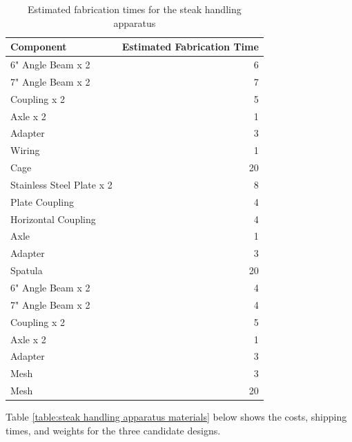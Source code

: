 \documentclass[11pt]{article}
\begin{document}
\begin{table}[H]
\begin{tabularx}{\textwidth}{X r}

\hline

Component & Estimated Fabrication Time \\

\hline

6" Angle Beam x 2 & 6 \\
7" Angle Beam x 2 & 7 \\
Coupling x 2 & 5 \\
Axle x 2 & 1 \\
Adapter & 3 \\
Wiring & 1 \\

\hline

Cage & 20 \\

\hline

Stainless Steel Plate x 2 & 8 \\
Plate Coupling & 4 \\
Horizontal Coupling & 4 \\
Axle & 1 \\
Adapter & 3 \\

\hline

Spatula & 20 \\

\hline

6" Angle Beam x 2 & 4 \\
7" Angle Beam x 2 & 4 \\
Coupling x 2 & 5 \\
Axle x 2 & 1 \\
Adapter & 3 \\
Mesh & 3 \\

\hline

Mesh & 20 \\

\hline

\end{tabularx}
\caption{Estimated fabrication times for the steak handling apparatus}
\label{table:steak handling fabrication times}
\end{table}

Table \ref{table:steak handling apparatus materials} below shows the costs, shipping times, and weights for the three candidate designs.
\end{document}
